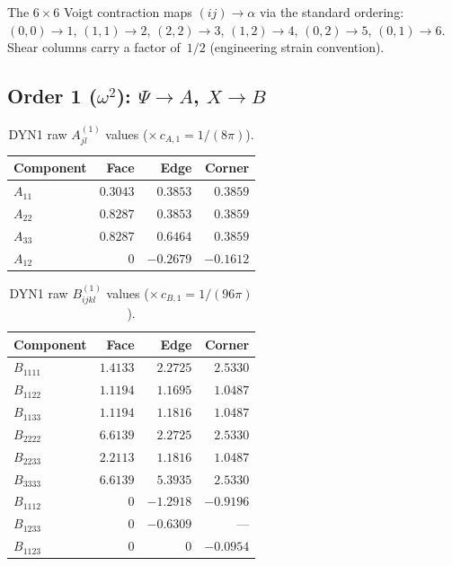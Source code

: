 \documentclass[11pt,a4paper]{article}
\theoremstyle{plain}
\theoremstyle{remark}
\begin{document}
The $6\times 6$ Voigt contraction maps $(ij) \to \alpha$ via the
standard ordering: $(0,0)\to 1$, $(1,1)\to 2$, $(2,2)\to 3$,
$(1,2)\to 4$, $(0,2)\to 5$, $(0,1)\to 6$.  Shear columns carry a
factor of~$1/2$ (engineering strain convention).

\subsection{Order 1 ($\omega^2$): $\Psi \to A$, $X \to B$}

\begin{table}[ht]
\centering
\caption{DYN1 raw $A^{(1)}_{jl}$ values ($\times\, c_{A,1} = 1/(8\pi)$).}
\label{tab:dyn1-A}
\begin{tabular}{l*{3}{r}}
\toprule
Component & Face & Edge & Corner \\
\midrule
$A_{11}$ & $0.3043$ & $0.3853$ & $0.3859$ \\
$A_{22}$ & $0.8287$ & $0.3853$ & $0.3859$ \\
$A_{33}$ & $0.8287$ & $0.6464$ & $0.3859$ \\
$A_{12}$ & $0$ & $-0.2679$ & $-0.1612$ \\
\bottomrule
\end{tabular}
\end{table}

\begin{table}[ht]
\centering
\caption{DYN1 raw $B^{(1)}_{ijkl}$ values ($\times\, c_{B,1} = 1/(96\pi)$).}
\label{tab:dyn1-B}
\begin{tabular}{l*{3}{r}}
\toprule
Component & Face & Edge & Corner \\
\midrule
$B_{1111}$ & $1.4133$ & $2.2725$ & $2.5330$ \\
$B_{1122}$ & $1.1194$ & $1.1695$ & $1.0487$ \\
$B_{1133}$ & $1.1194$ & $1.1816$ & $1.0487$ \\
$B_{2222}$ & $6.6139$ & $2.2725$ & $2.5330$ \\
$B_{2233}$ & $2.2113$ & $1.1816$ & $1.0487$ \\
$B_{3333}$ & $6.6139$ & $5.3935$ & $2.5330$ \\
$B_{1112}$ & $0$ & $-1.2918$ & $-0.9196$ \\
$B_{1233}$ & $0$ & $-0.6309$ & --- \\
$B_{1123}$ & $0$ & $0$ & $-0.0954$ \\
\bottomrule
\end{tabular}
\end{table}
\end{document}
